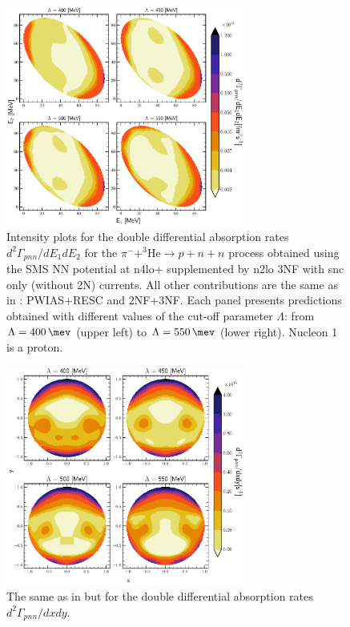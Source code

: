     \begin{figure}[h]
        \begin{center}
        \includegraphics[width=0.7\textwidth]{PlotData/PION/Dalitz_maps/figures/Dalitz_map_pnn_E1E2_cutofs_1NC.pdf}
        \end{center}
        \caption{Intensity plots for the double differential absorption rates
        $d^2 \Gamma_{pnn}/dE_1dE_2$ for the $\pi^- + ^3\text{He} \rightarrow p + n + n$
        process obtained using the SMS NN potential at \gls{n4lo+} supplemented by \gls{n2lo} 3NF
        with \gls{snc} only (without 2N) currents.
        All other contributions are the same as in : PWIAS+RESC and 2NF+3NF.
        Each panel presents predictions obtained with different values of the cut-off parameter $\Lambda$:
        from $\Lambda = \SI{400}{\mev}$ (upper left) to $\Lambda = \SI{550}{\mev}$ (lower right). Nucleon 1 is a proton.}
        \label{pion_map_E1E2_cutoff_1NC}
    \end{figure}

    \begin{figure}[h]
        \begin{center}
        \includegraphics[width=0.7\textwidth]{PlotData/PION/Dalitz_maps/figures/Dalitz_map_pnn_xy_cutofs_1NC.pdf}
        \end{center}
        \caption{The same as in  but for the double differential absorption rates
        $d^2 \Gamma_{pnn}/dxdy$.}
        \label{pion_map_xy_cutoff_1NC}
    \end{figure}

